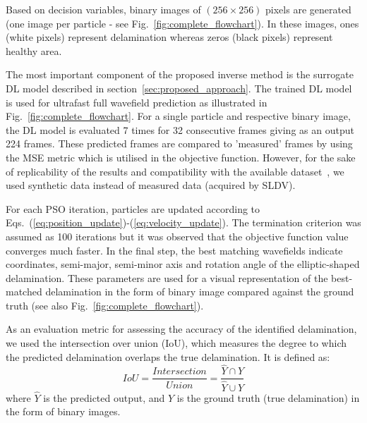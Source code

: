Based on decision variables, binary images of $(256\times256)$ pixels are generated (one image per particle - see Fig.~\ref{fig:complete_flowchart}).
In these images, ones (white pixels) represent delamination whereas zeros (black pixels) represent healthy area.

The most important component of the proposed inverse method is the surrogate DL model described in section~\ref{sec:proposed_approach}.
The trained DL model is used for ultrafast full wavefield prediction as illustrated in Fig.~\ref{fig:complete_flowchart}.
For a single particle and respective binary image, the DL model is evaluated 7 times for 32 consecutive frames giving as an output 224 frames. 
These predicted frames are compared to 'measured' frames by using the MSE metric which is utilised in the objective function.
However, for the sake of replicability of the results and compatibility with the available dataset~\cite{kudela_pawel_2021_5414555}, we used synthetic data instead of measured data (acquired by SLDV).

For each PSO iteration, particles are updated according to Eqs.~(\ref{eq:position_update})-(\ref{eq:velocity_update}).
The termination criterion was assumed as 100 iterations but it was observed that the objective function value converges much faster.
In the final step, the best matching wavefields indicate coordinates, semi-major, semi-minor axis and rotation angle of the elliptic-shaped delamination. 
These parameters are used for a visual representation of the best-matched delamination in the form of binary image compared against the ground truth (see also Fig.~\ref{fig:complete_flowchart}).

As an evaluation metric for assessing the accuracy of the identified 
delamination, we used the intersection over union (IoU), which measures the 
degree to which the predicted delamination overlaps the true delamination. 
It is defined as:
\begin{equation}
	IoU=\frac{Intersection}{Union}=\frac{\hat{Y} \cap Y}{\hat{Y} \cup Y}
	\label{eq:iou}
\end{equation}
where \(\hat{Y}\) is the predicted output, and \(Y\) is the ground truth (true delamination) in the form of binary images.

